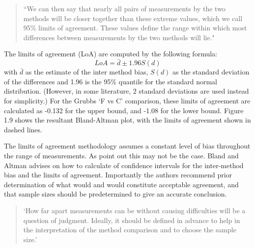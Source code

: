 \documentclass{report}
\begin{document}
	\begin{quote} ``We can then say that nearly all pairs
		of measurements by the two methods will be closer together than
		these extreme values, which we call 95\% limits of agreement.
		These values define the range within which most differences
		between measurements by the two methods will lie."
	\end{quote}
	
	The limits of agreement (LoA) are computed by the following
	formula:
	\begin{equation}
	LoA = \bar{d} \pm 1.96 S(d)
	\end{equation}
	with $\bar{d}$ as the estimate of the inter method bias, $S(d)$ as
	the standard deviation of the differences and 1.96 is the 95\%
	quantile for the standard normal distribution. (However, in some
	literature, 2 standard deviations are used instead for
	simplicity.) For the Grubbs `F vs C' comparison, these limits of
	agreement are calculated as -0.132 for the upper bound, and -1.08
	for the lower bound. Figure 1.9 shows the resultant Bland-Altman
	plot, with the limits of agreement shown in dashed lines.
	
	
	The limits of agreement methodology assumes a constant level of
	bias throughout the range of measurements. As \citet*{BA86} point
	out this may not be the case. Bland and Altman advises on how to
	calculate of confidence intervals for the inter-method bias and
	the limits of agreement. Importantly the authors recommend prior
	determination of what would and would constitute acceptable
	agreement, and that sample sizes should be predetermined to give
	an accurate conclusion.
	
	\begin{quote}
		`How far apart measurements can be without causing difficulties
		will be a question of judgment. Ideally, it should be defined in
		advance to help in the interpretation of the method comparison and
		to choose the sample size.'\citep{BA86}
	\end{quote}
	
\end{document}

